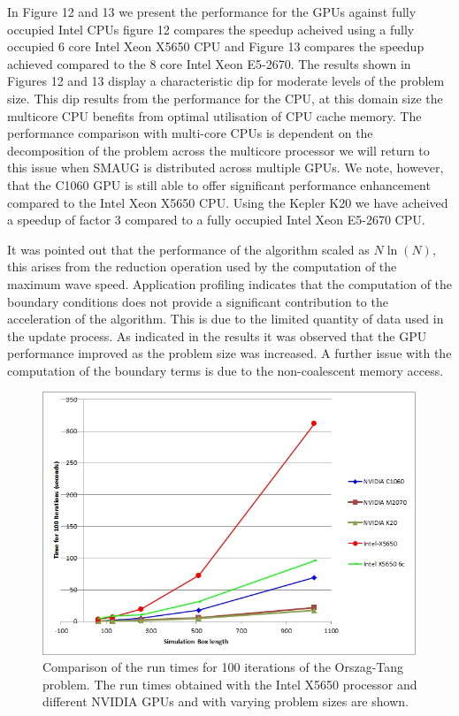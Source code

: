 In Figure 12 and 13 we present  the performance for the GPUs against fully occupied Intel CPUs figure 12 compares the speedup acheived using a fully occupied 6 core Intel Xeon X5650 CPU and Figure 13 compares the speedup achieved compared to the 8 core Intel Xeon E5-2670. The results shown in Figures 12 and 13 display a characteristic dip for moderate levels of the problem size. This dip results from the performance for the CPU, at this domain size the multicore CPU benefits from optimal utilisation of CPU cache memory. The performance comparison with multi-core CPUs is dependent on the decomposition of the problem across the multicore processor we will return to this issue when SMAUG is distributed across multiple GPUs. We note, however, that the C1060 GPU is still able to offer significant performance enhancement compared to the Intel Xeon X5650 CPU. Using the Kepler K20 we have acheived a speedup of factor 3 compared to a fully occupied Intel Xeon E5-2670 CPU.

It was pointed out that the performance of the algorithm scaled as $N\ln{(N)}$, this arises from the reduction operation used by the computation of the maximum wave speed. Application profiling indicates that the computation of the boundary conditions does not provide a significant contribution to the acceleration of the algorithm. This is due to the limited quantity of data used in the update process. As indicated in the results it was observed that the GPU performance improved as the problem size was increased. A further issue with the computation of the boundary terms is due to the non-coalescent memory access.\\



\begin{figure}[h]
\includegraphics[scale=0.7]{figure8_x5650_timings.jpg}
\caption{Comparison of the run times for 100 iterations of the Orszag-Tang problem. The run times obtained with the Intel X5650 processor and different NVIDIA GPUs and with varying problem sizes are shown.}
\end{figure}




